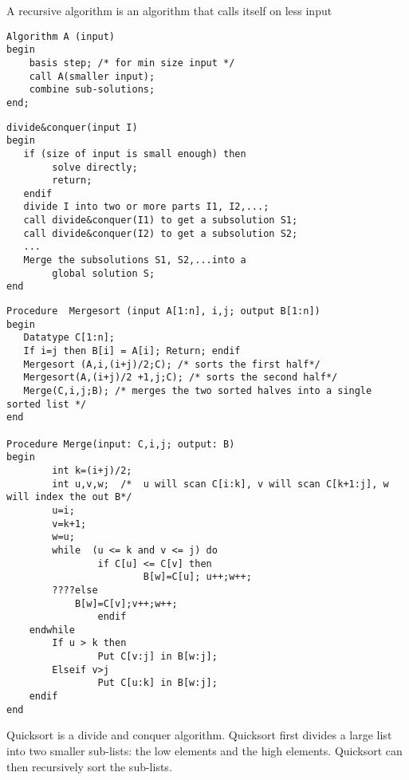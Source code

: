 \documentclass[9pt]{amsart}
\newcommand{\filldots}{\noindent \textbf {\textcolor {blue} {\dotfill}} }
\begin{document}
\begin{multicols}{2}
\noindent A recursive algorithm is an algorithm that calls itself on less input

\begin{lstlisting}
Algorithm A (input)
begin
	basis step; /* for min size input */
	call A(smaller input);
	combine sub-solutions;
end;
\end{lstlisting}

\filldots 

\noindent {\textcolor {blue} {\em Divide and Conquer}} 
\begin{lstlisting}
divide&conquer(input I)
begin
   if (size of input is small enough) then
        solve directly;
        return;
   endif
   divide I into two or more parts I1, I2,...;
   call divide&conquer(I1) to get a subsolution S1;
   call divide&conquer(I2) to get a subsolution S2;
   ...
   Merge the subsolutions S1, S2,...into a
        global solution S;
end
\end{lstlisting}

\noindent {\textcolor {blue} {\em MergeSort}} 

\begin{lstlisting}
Procedure  Mergesort (input A[1:n], i,j; output B[1:n])
begin
   Datatype C[1:n];
   If i=j then B[i] = A[i]; Return; endif
   Mergesort (A,i,(i+j)/2;C); /* sorts the first half*/
   Mergesort(A,(i+j)/2 +1,j;C); /* sorts the second half*/
   Merge(C,i,j;B); /* merges the two sorted halves into a single sorted list */
end

Procedure Merge(input: C,i,j; output: B)
begin
        int k=(i+j)/2;
        int u,v,w;  /*  u will scan C[i:k], v will scan C[k+1:j], w will index the out B*/
        u=i;
        v=k+1;
        w=u;
        while  (u <= k and v <= j) do
                if C[u] <= C[v] then
                        B[w]=C[u]; u++;w++;
		????else
			B[w]=C[v];v++;w++;
        		endif
	endwhile
        If u > k then
                Put C[v:j] in B[w:j];
        Elseif v>j
                Put C[u:k] in B[w:j];
	endif 
end

\end{lstlisting}

\filldots 

\noindent {\textcolor {blue} {\em QuickSort}} 

\noindent Quicksort is a divide and conquer algorithm. Quicksort first divides a large list into two smaller sub-lists: the low elements and the high elements. Quicksort can then recursively sort the sub-lists.

\filldots 


\end{multicols}
\end{document}

